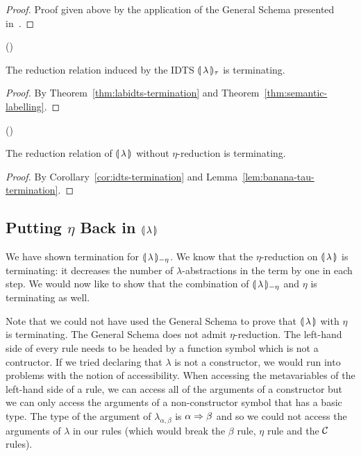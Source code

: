 \begin{proof}
  Proof given above by the application of the General Schema presented
  in~\cite{blanqui2000termination}.
\end{proof}

\begin{corollary}\label{cor:idts-termination}
  ()

  The reduction relation induced by the IDTS ${\llparenthesis \, \lambda \, \rrparenthesis_\tau}$ is terminating.
\end{corollary}

\begin{proof}
  By Theorem~\ref{thm:labidts-termination} and
  Theorem~\ref{thm:semantic-labelling}.
\end{proof}

\begin{corollary}\label{cor:intcalc-termination}
  ()
  
  The reduction relation of $\llparenthesis \, \lambda \, \rrparenthesis$ without $\eta$-reduction is
  terminating.
\end{corollary}

\begin{proof}
  By Corollary~\ref{cor:idts-termination} and
  Lemma~\ref{lem:banana-tau-termination}.
\end{proof}


\subsection{Putting \texorpdfstring{$\eta$}{eta} Back in
  \texorpdfstring{$\llparenthesis \, \lambda \, \rrparenthesis$}{Our Calculus}}
\label{ssec:termination-eta}

We have shown termination for ${\llparenthesis \, \lambda \, \rrparenthesis_{-\eta}}$. We know that the $\eta$-reduction
on ${\llparenthesis \, \lambda \, \rrparenthesis}$ is terminating: it decreases the number of
$\lambda$-abstractions in the term by one in each step. We would now like
to show that the combination of ${\llparenthesis \, \lambda \, \rrparenthesis_{-\eta}}$ and $\eta$ is terminating as
well.

Note that we could not have used the General Schema to prove that ${\llparenthesis \, \lambda \, \rrparenthesis}$
with $\eta$ is terminating. The General Schema does not admit
$\eta$-reduction. The left-hand side of every rule needs to be headed by a
function symbol which is not a contructor. If we tried declaring that
$\lambda$ is not a constructor, we would run into problems with the notion
of accessibility. When accessing the metavariables of the left-hand side of
a rule, we can access all of the arguments of a constructor but we can only
access the arguments of a non-constructor symbol that has a basic type. The
type of the argument of $\lambda_{\alpha,\beta}$ is $\alpha \Rightarrow \beta$ and
so we could not access the arguments of $\lambda$ in our rules (which would
break the $\beta$ rule, $\eta$ rule and the $\mathcal{C}$ rules).

